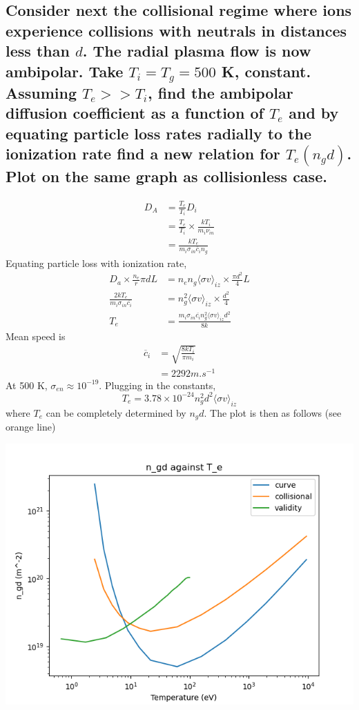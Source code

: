\documentclass[answers]{exam}
\begin{document}
\begin{questions}
\begin{parts}
\part{Consider next the collisional regime where ions experience collisions with neutrals in distances less than $d$. The radial plasma flow is now ambipolar. Take $T_i = T_g = 500$ K, constant. Assuming $T_e >> T_i$, find the ambipolar diffusion coefficient as a function of $T_e$ and by equating particle loss rates radially to the ionization rate find a new relation for $T_e(n_gd)$. Plot on the same graph as collisionless case.}

\begin{solution}
    \begin{align*}
        D_A &= \frac{T_e}{T_i} D_i \\
            &= \frac{T_e}{T_i} \times \frac{kT_i}{m_i\nu_{in}} \\
            &= \frac{kT_e}{m_i\sigma_{in}\overline c_i n_g}
    \end{align*}
    Equating particle loss with ionization rate,
    \begin{align*}
        D_a \times \frac{n_e}{r} \pi dL &= n_en_g\langle \sigma v \rangle_{iz} \times \frac{\pi d^2}{4} L \\
        \frac{2kT_e}{m_i\sigma_{in}\overline{c_i}} &= n_g^2\langle \sigma v \rangle_{iz} \times \frac{d^2}{4} \\
        T_e &= \frac{m_i\sigma_{in}\overline{c_i}n_g^2\langle \sigma v \rangle_{iz}d^2}{8k}
    \end{align*}
    Mean speed is
    \begin{align*}
        \overline c_i &= \sqrt{\frac{8kT_i}{\pi m_i}} \\
                      &= 2292 \unit{m.s^{-1}}
    \end{align*}
    At 500 K, $\sigma_{en} \approx 10^{-19}$. Plugging in the constants,
    $$T_e = 3.78 \times 10^{-24}n_g^2d^2\langle \sigma v \rangle_{iz}$$
    where $T_e$ can be completely determined by $n_gd$. The plot is then as follows (see orange line)
    \begin{center}
        \includegraphics[scale=0.5]{q2d.png}

\end{center}
\end{solution}
\end{parts}
\end{questions}
\end{document}
